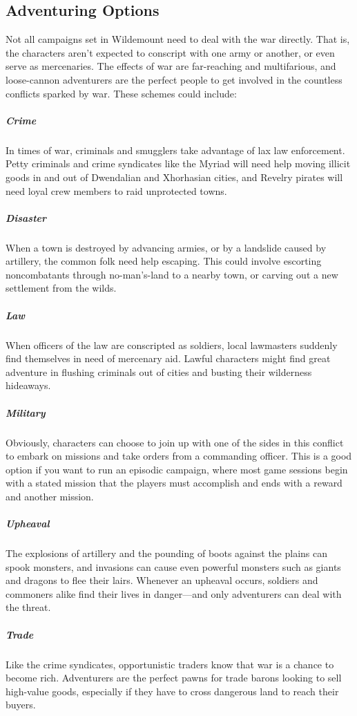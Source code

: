 \documentclass[10pt,a4paper,twoside,bg=print,twocolumn,openany,nodeprecatedcode]{dndbook}
\begin{document}
\subsection{Adventuring Options}
Not all campaigns set in Wildemount need to deal with the war directly. That is, the characters aren't expected to conscript with one army or another, or even serve as mercenaries. The effects of war are far-reaching and multifarious, and loose-cannon adventurers are the perfect people to get involved in the countless conflicts sparked by war. These schemes could include:

\subparagraph{Crime}
In times of war, criminals and smugglers take advantage of lax law enforcement. Petty criminals and crime syndicates like the Myriad will need help moving illicit goods in and out of Dwendalian and Xhorhasian cities, and Revelry pirates will need loyal crew members to raid unprotected towns.

\subparagraph{Disaster}
When a town is destroyed by advancing armies, or by a landslide caused by artillery, the common folk need help escaping. This could involve escorting noncombatants through no-man's-land to a nearby town, or carving out a new settlement from the wilds.

\subparagraph{Law}
When officers of the law are conscripted as soldiers, local lawmasters suddenly find themselves in need of mercenary aid. Lawful characters might find great adventure in flushing criminals out of cities and busting their wilderness hideaways.

\subparagraph{Military}
Obviously, characters can choose to join up with one of the sides in this conflict to embark on missions and take orders from a commanding officer. This is a good option if you want to run an episodic campaign, where most game sessions begin with a stated mission that the players must accomplish and ends with a reward and another mission.

\subparagraph{Upheaval}
The explosions of artillery and the pounding of boots against the plains can spook monsters, and invasions can cause even powerful monsters such as giants and dragons to flee their lairs. Whenever an upheaval occurs, soldiers and commoners alike find their lives in danger—and only adventurers can deal with the threat.

\subparagraph{Trade}
Like the crime syndicates, opportunistic traders know that war is a chance to become rich. Adventurers are the perfect pawns for trade barons looking to sell high-value goods, especially if they have to cross dangerous land to reach their buyers.
\end{document}
